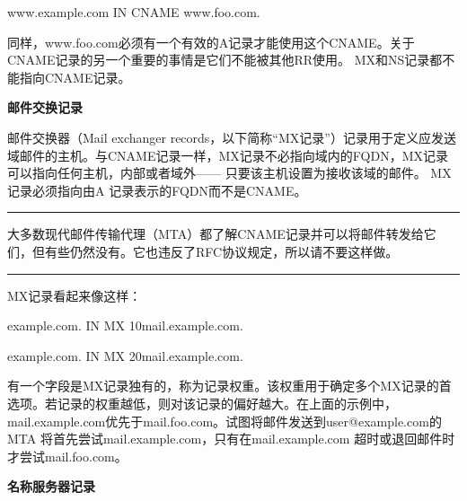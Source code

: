 ﻿\documentclass[english,runningheads,a4paper]{llncs}[2018/03/10]
\begin{document}
\par\setlength\parindent{2em}www.example.com  \qquad IN \qquad CNAME \qquad www.foo.com.

\par\setlength\parindent{2em}同样，www.foo.com必须有一个有效的A记录才能使用这个CNAME。关于CNAME记录的另一个重要的事情是它们不能被其他RR使用。 MX和NS记录都不能指向CNAME记录。

\vbox{}

\par\noindent\textbf{邮件交换记录}

\par\noindent 邮件交换器（Mail exchanger records，以下简称“MX记录”）记录用于定义应发送域邮件的主机。与CNAME记录一样，MX记录不必指向域内的FQDN，MX记录可以指向任何主机，内部或者域外—— 只要该主机设置为接收该域的邮件。 MX 记录必须指向由A 记录表示的FQDN而不是CNAME。

\par\noindent\rule[0.25\baselineskip]{\textwidth}{1pt} %

\begin{adjustwidth}{2em}{2em}
\qquad 大多数现代邮件传输代理（MTA）都了解CNAME记录并可以将邮件转发给它们，但有些仍然没有。它也违反了RFC协议规定，所以请不要这样做。
\end{adjustwidth}

\par\noindent\rule[0.25\baselineskip]{\textwidth}{1pt} %

\par\setlength\parindent{2em}MX记录看起来像这样：

\par\setlength\parindent{2em}example.com.  \qquad IN \qquad MX \qquad 10mail.example.com.

\par\setlength\parindent{2em}example.com.  \qquad IN \qquad MX \qquad 20mail.example.com.

\par\setlength\parindent{2em}有一个字段是MX记录独有的，称为记录权重。该权重用于确定多个MX记录的首选项。若记录的权重越低，则对该记录的偏好越大。在上面的示例中，mail.example.com优先于mail.foo.com。试图将邮件发送到user@example.com的MTA 将首先尝试mail.example.com，只有在mail.example.com 超时或退回邮件时才尝试mail.foo.com。

\vbox{}

\par\noindent\textbf{名称服务器记录}
\end{document}
